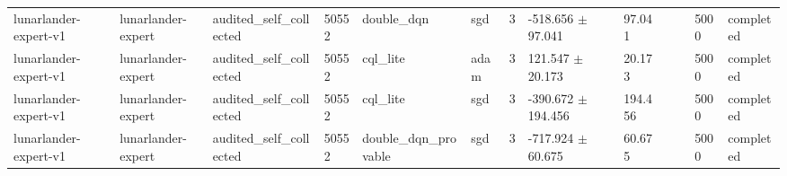 \begin{table}[t]
\begin{tabular}{llllllllllll}
lunarlander-expert-v1 & lunarlander-expert & audited\_self\_collected & 50552 & double\_dqn & sgd & 3 & -518.656 $\pm$ 97.041 & 97.041 &  &  & 5000 & completed \\
lunarlander-expert-v1 & lunarlander-expert & audited\_self\_collected & 50552 & cql\_lite & adam & 3 & 121.547 $\pm$ 20.173 & 20.173 &  &  & 5000 & completed \\
lunarlander-expert-v1 & lunarlander-expert & audited\_self\_collected & 50552 & cql\_lite & sgd & 3 & -390.672 $\pm$ 194.456 & 194.456 &  &  & 5000 & completed \\
lunarlander-expert-v1 & lunarlander-expert & audited\_self\_collected & 50552 & double\_dqn\_provable & sgd & 3 & -717.924 $\pm$ 60.675 & 60.675 &  &  & 5000 & completed \\
\bottomrule
\end{tabular}
\end{table}
